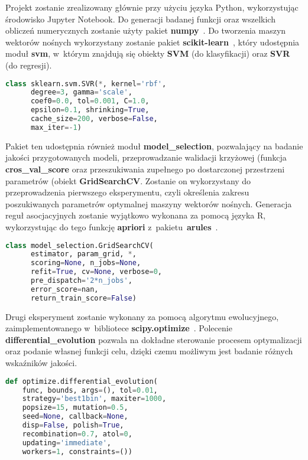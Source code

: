 
Projekt zostanie zrealizowany głównie przy użyciu języka Python, wykorzystując środowisko Jupyter Notebook. Do generacji badanej funkcji oraz wszelkich obliczeń numerycznych zostanie użyty pakiet \textbf{numpy}~\cite{numpy}. Do tworzenia maszyn wektorów nośnych wykorzystany zostanie pakiet \textbf{scikit-learn}~\cite{scikit-learn}, który udostępnia moduł \textbf{svm}, w~którym znajdują się obiekty \textbf{SVM} (do klasyfikacji) oraz \textbf{SVR} (do regresji). 

\begin{lstlisting}[language=Python, captionpos=b, caption=Nagłówek klasy sklearn.svm.SVR]
class sklearn.svm.SVR(*, kernel='rbf', 
      degree=3, gamma='scale', 
      coef0=0.0, tol=0.001, C=1.0, 
      epsilon=0.1, shrinking=True, 
      cache_size=200, verbose=False, 
      max_iter=-1)
\end{lstlisting}

Pakiet ten udostępnia również moduł \textbf{model\_{}selection}, pozwalający na badanie jakości przygotowanych modeli, przeprowadzanie walidacji krzyżowej (funkcja \textbf{cros\_{}val\_{}score} oraz przeszukiwania zupełnego po dostarczonej przestrzeni parametrów (obiekt \textbf{GridSearchCV}. Zostanie on wykorzystany do przeprowadzenia pierwszego eksperymentu, czyli określenia zakresu poszukiwanych parametrów optymalnej maszyny wektorów nośnych. Generacja reguł asocjacyjnych zostanie wyjątkowo wykonana za pomocą języka R, wykorzystując do tego funkcję \textbf{apriori} z~pakietu~\textbf{arules}~\cite{arules}.

\begin{lstlisting}[language=Python, captionpos=b, caption=Nagłówek klasy model\_{}selection.GridSearchCV]
class model_selection.GridSearchCV(
      estimator, param_grid, *, 
      scoring=None, n_jobs=None, 
      refit=True, cv=None, verbose=0, 
      pre_dispatch='2*n_jobs',
      error_score=nan, 
      return_train_score=False)
\end{lstlisting}


Drugi eksperyment zostanie wykonany za pomocą algorytmu ewolucyjnego, zaimplementowanego w~bibliotece \textbf{scipy.optimize}~\cite{scipy}. Polecenie \textbf{differential\_{}evolution} pozwala na dokładne sterowanie procesem optymalizacji oraz podanie własnej funkcji celu, dzięki czemu możliwym jest badanie różnych wskaźników jakości. 

\begin{lstlisting}[language=Python, captionpos=b, caption=Nagłówek funkcji optimize.differential\_{}evolution]
def optimize.differential_evolution(
    func, bounds, args=(), tol=0.01, 
    strategy='best1bin', maxiter=1000, 
    popsize=15, mutation=0.5, 
    seed=None, callback=None, 
    disp=False, polish=True, 
    recombination=0.7, atol=0, 
    updating='immediate', 
    workers=1, constraints=())
\end{lstlisting}


